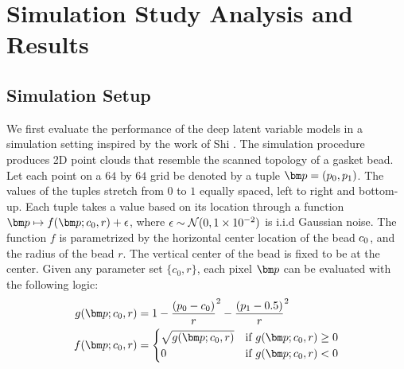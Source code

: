 \documentclass{scrartcl}
\theoremstyle{definition}
\begin{document}
\section{Simulation Study Analysis and Results}
\subsection{Simulation Setup}\label{sec:simsetting}
We first evaluate the performance of the deep latent variable models in a simulation setting inspired by the work of Shi \etal \parencite{Shi2016-tg}. The simulation procedure produces 2D point clouds that resemble the scanned topology of a gasket bead.
Let each point on a $64$ by $64$ grid be denoted by a tuple $\mbp = (p_0, p_1)$.
The values of the tuples stretch from $0$ to $1$ equally spaced, left to right and bottom-up.
Each tuple takes a value based on its location through a function $\mbp \mapsto f(\mbp; \czero, r) + \epsilon$, where $\epsilon \sim \mathcal{N}(0, 1\times10^{-2})$ is i.i.d Gaussian noise.
The function $f$ is parametrized by the horizontal center location  of the bead $ c_{0} $, and the radius of the bead $r$.
The vertical center of the bead is fixed to be at the center.
Given any parameter set $\{c_0,r\}$, each pixel $\mbp$ can be evaluated with the following logic:
\begin{equation}
\label{eq:gasketfun}
\begin{split}
g(\mbp; c_0,r)&=1-\frac{(p_0 - \czero)}{r}^2 - \frac{(p_1 - 0.5)}{r}^2 \\
	f(\mbp; c_0,r)&= 
	 \begin{cases} 
	 \sqrt{g(\mbp; c_0,r)} &\mbox{if } g(\mbp; c_0,r) \geq 0 \\ 
 0 & \mbox{if } g(\mbp; c_0,r)<0 
	\end{cases}
\end{split}
\end{equation}
\end{document}
